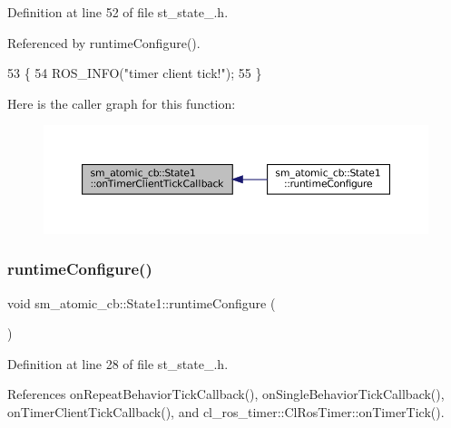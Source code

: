 Definition at line 52 of file st\+\_\+state\+\_.\+h.



Referenced by runtime\+Configure().


\begin{DoxyCode}
53     \{
54         ROS\_INFO(\textcolor{stringliteral}{"timer client tick!"});
55     \}
\end{DoxyCode}
Here is the caller graph for this function\+:
\nopagebreak
\begin{figure}[H]
\begin{center}
\leavevmode
\includegraphics[width=350pt]{structsm__atomic__cb_1_1State1_a1e1f3cc8c74bc13e28ce47f133c2cecb_icgraph}
\end{center}
\end{figure}
\mbox{\label{structsm__atomic__cb_1_1State1_a72dd5ac4a82271c55f1f3b07870746aa}} 
\subsubsection{\texorpdfstring{runtime\+Configure()}{runtimeConfigure()}}
{\footnotesize\ttfamily void sm\+\_\+atomic\+\_\+cb\+::\+State1\+::runtime\+Configure (\begin{DoxyParamCaption}{ }\end{DoxyParamCaption})\hspace{0.3cm}{\ttfamily [inline]}}



Definition at line 28 of file st\+\_\+state\+\_.\+h.



References on\+Repeat\+Behavior\+Tick\+Callback(), on\+Single\+Behavior\+Tick\+Callback(), on\+Timer\+Client\+Tick\+Callback(), and cl\+\_\+ros\+\_\+timer\+::\+Cl\+Ros\+Timer\+::on\+Timer\+Tick().


